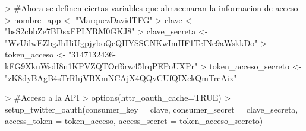 
\begin{Schunk}
\begin{Sinput}
>   #Ahora se definen ciertas variables que almacenaran la informacion de acceso
>   nombre_app <- "MarquezDavidTFG"
>   clave <- "bsS2cbbZe7BDsxFPLYRM0GKJ8"
>   clave_secreta <- "WvUilwEZbgJhHiUgpjyboQcQHYSSCNKwImHF1TeINe9aWskkDo"
>   token_acceso <- "3147132436-kFG9XkuWsdI8n1KPVZQTOrf6rw45lrqPEPoUXPr"
>   token_acceso_secreto <- "zK8dyBAgB4sTrRhjVBXmNCAjX4QQvCUfQIXckQmTrcAix"

>   #Acceso a la API
>   options(httr_oauth_cache=TRUE)
>   setup_twitter_oauth(consumer_key = clave, consumer_secret = clave_secreta, access_token = token_acceso, access_secret = token_acceso_secreto)
\end{Sinput}
\end{Schunk}
